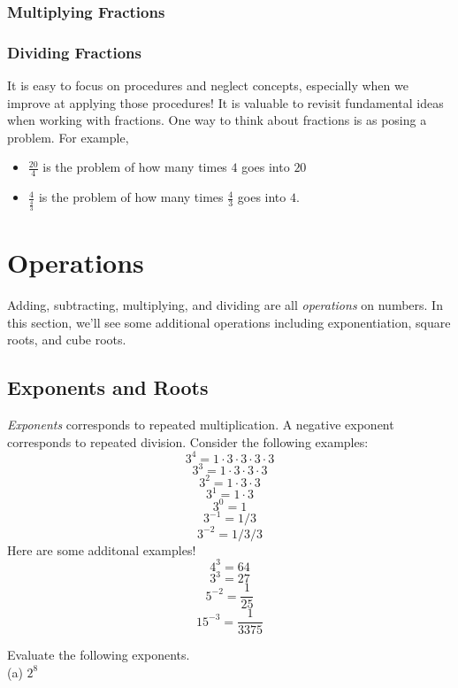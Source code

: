 \subsubsection{Multiplying Fractions}


\subsubsection{Dividing Fractions}

\begin{remark}
	It is easy to focus on procedures and neglect concepts, especially when we improve at applying those procedures!  
	It is valuable to revisit fundamental ideas when working with fractions.  
	One way to think about fractions is as posing a problem. 
	For example, 
	\begin{itemize}
		\item \(\frac{20}{4}\) is the problem of how many times \(4\) goes into \(20\)
		\item 	\(\frac{4}{\frac{4}{3}}\) is the problem of how many times \(\frac{4}{3}\) goes into \(4\). 
	\end{itemize}

\end{remark}



\newpage 
\section{Operations}

Adding, subtracting, multiplying, and dividing are all \emph{operations} on numbers.  In this section, we'll see some additional operations including exponentiation, square roots, and cube roots.  

\subsection{Exponents and Roots} 
\emph{Exponents} corresponds to repeated multiplication.  
A negative exponent corresponds to repeated division.  
Consider the following examples:
\[ 3^{4} = 1 \cdot 3 \cdot 3 \cdot 3 \cdot 3   \]
\[ 3^{3} = 1 \cdot 3 \cdot 3 \cdot 3    \]
\[ 3^{2} = 1 \cdot 3 \cdot 3   \]
\[ 3^{1} = 1 \cdot 3    \]
\[ 3^{0} = 1    \]
\[ 3^{-1} = 1 / 3  \]
\[ 3^{-2} = 1 / 3 / 3 \]
Here are some additonal examples!
\[ 4^{3} = 64 \]
\[ 3^{3} = 27  \]
\[ 5^{-2} = \frac{1}{25}  \]
\[  15^{-3} = \frac{1}{3375} \]
\begin{exercise}
	Evaluate the following exponents.
	\\ \hspace*{15mm} (a) \( 2^{8} \)
	\label{ex:basicexponents}
\end{exercise}


